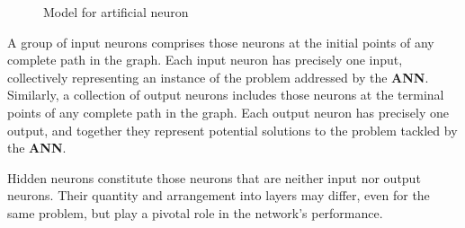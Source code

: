 \documentclass[a4paper]{report}
\def\nstyle{int(\lay<\Nnodlen?min(2,\lay):3)} %
\begin{document}
{\begin{figure}[H]
\begin{center}
\end{center}
\caption{Model for artificial neuron}
\end{figure}
A group of input neurons comprises those neurons at the initial points of any complete path in the graph. Each input neuron has precisely one input, collectively representing an instance of the problem addressed by the \textbf{ANN}. Similarly, a collection of output neurons includes those neurons at the terminal points of any complete path in the graph. Each output neuron has precisely one output, and together they represent potential solutions to the problem tackled by the \textbf{ANN}.

Hidden neurons constitute those neurons that are neither input nor output neurons. Their quantity and arrangement into layers may differ, even for the same problem, but play a pivotal role in the network's performance.
\begin{figure}[H]
\begin{center}
\end{center}
\end{figure}}
\end{document}
